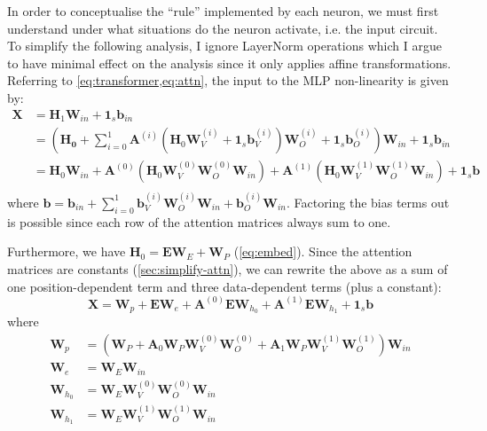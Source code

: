 \documentclass{article}
\renewcommand{\v}[1]{\mathbf{\bm{#1}}}
\newcommand{\m}[1]{\mathbf{\bm{#1}}}
\begin{document}
In order to conceptualise the ``rule'' implemented by each neuron, we must first understand under what situations do the neuron activate, i.e. the input circuit. To simplify the following analysis, I ignore LayerNorm operations which I argue to have minimal effect on the analysis since it only applies affine transformations. Referring to \cref{eq:transformer,eq:attn}, the input to the MLP non-linearity is given by:
\begin{equation*}
    \begin{aligned}
        \m{X} & = \m{H}_1 \m{W}_{in} + \v{1}_s \v{b}_{in} \\
              & = \left(
        \m{H_0}
        + \sum_{i=0}^1 \m{A}^{(i)} (
        \m{H}_0 \m{W}_V^{(i)} + \v{1}_s \v{b}_V^{(i)}
        ) \m{W}_O^{(i)} + \v{1}_s \v{b}_O^{(i)}
        \right) \m{W}_{in} + \v{1}_s \v{b}_{in}           \\
              & = \m{H}_0 \m{W}_{in}
        + \m{A}^{(0)} (\m{H}_0 \m{W}_V^{(0)} \m{W}_O^{(0)} \m{W}_{in})
        + \m{A}^{(1)} (\m{H}_0 \m{W}_V^{(1)} \m{W}_O^{(1)} \m{W}_{in})
        + \v{1}_s \v{b}                                   \\
    \end{aligned}
\end{equation*}
where $\v{b} = \v{b}_{in} + \sum_{i=0}^{1} \v{b}_V^{(i)} \m{W}_O^{(i)} \m{W}_{in} + \v{b}_O^{(i)} \m{W}_{in}$. Factoring the bias terms out is possible since each row of the attention matrices always sum to one.

Furthermore, we have $\m{H}_0 = \m{E} \m{W}_E + \m{W}_P$ (\cref{eq:embed}). Since the attention matrices are constants (\cref{sec:simplify-attn}), we can rewrite the above as a sum of one position-dependent term and three data-dependent terms (plus a constant):
\begin{equation} \label{eq:four-circuits}
    \m{X} =
    \m{W}_p
    + \m{E} \m{W}_e
    + \m{A}^{(0)} \m{E} \m{W}_{h_0}
    + \m{A}^{(1)} \m{E} \m{W}_{h_1}
    + \v{1}_s \v{b}
\end{equation}
where
\begin{equation*}
    \begin{aligned}
        \m{W}_p
         & = \left(\m{W}_P
        + \m{A}_0 \m{W}_P \m{W}_V^{(0)} \m{W}_O^{(0)}
        + \m{A}_1 \m{W}_P \m{W}_V^{(1)} \m{W}_O^{(1)}
        \right) \m{W}_{in}                                  \\
        \m{W}_e
         & = \m{W}_E \m{W}_{in}                             \\
        \m{W}_{h_0}
         & = \m{W}_E \m{W}_V^{(0)} \m{W}_O^{(0)} \m{W}_{in} \\
        \m{W}_{h_1}
         & = \m{W}_E \m{W}_V^{(1)} \m{W}_O^{(1)} \m{W}_{in}
    \end{aligned}
\end{equation*}
\end{document}
